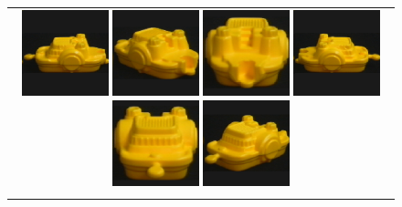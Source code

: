 \begin{figure}[bp]
\vspace{5pt}
\centering
\begin{tabular}{@{}c@{}}
\begin{minipage}{\textwidth}
\centering
\includegraphics[width=2.5cm]{coil/beeld-12.eps}
\includegraphics[width=2.5cm]{coil/beeld-16.eps}
\includegraphics[width=2.5cm]{coil/beeld-17.eps}
\includegraphics[width=2.5cm]{coil/beeld-13.eps}
\includegraphics[width=2.5cm]{coil/beeld-14.eps}
\includegraphics[width=2.5cm]{coil/beeld-15.eps}
\vspace{6pt}
\end{minipage}\vspace{4pt}\\
\subfigure[]{
}
\end{tabular}
\end{figure}
